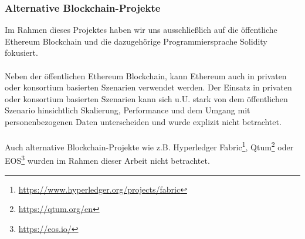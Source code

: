 \subsubsection{Alternative Blockchain-Projekte}
Im Rahmen dieses Projektes haben wir uns ausschließlich auf die öffentliche Ethereum Blockchain und die dazugehörige Programmiersprache Solidity fokusiert.

\paragraph*{}
Neben der öffentlichen Ethereum Blockchain, kann Ethereum auch in privaten oder konsortium basierten Szenarien verwendet werden. Der Einsatz in privaten oder konsortium basierten Szenarien kann sich u.U. stark von dem öffentlichen Szenario hinsichtlich Skalierung, Performance und dem Umgang mit personenbezogenen Daten unterscheiden und wurde explizit nicht betrachtet.

\paragraph*{}
Auch alternative Blockchain-Projekte wie z.B. 
Hyperledger Fabric\footnote{\url{https://www.hyperledger.org/projects/fabric}}, 
Qtum\footnote{\url{https://qtum.org/en}}
oder EOS\footnote{\url{https://eos.io/}}
wurden im Rahmen dieser Arbeit nicht betrachtet. 